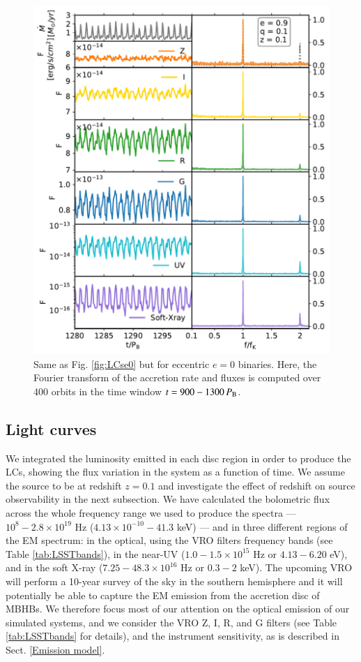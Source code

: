\documentclass{aa}
\begin{document}
\begin{figure}
    \includegraphics[width=\columnwidth]{Figures/e09q01_hr01_md001_3aOpticAll_Flux_bands_9000_0.1_new.pdf}
    \caption{\label{fig:LCse09} 
    Same as Fig. \ref{fig:LCse0} but for eccentric $e=0$ binaries. Here, the Fourier transform of the accretion rate and fluxes is computed over 400 orbits in the time window $t=900-1300 \,P_{\rm B}$. 
}
\end{figure}


\subsection{Light curves}
\label{LCs}


We integrated the luminosity emitted in each disc region in order to produce the LCs, showing the flux variation in the system as a function of time. We assume the source to be at redshift $z=0.1$ and investigate the effect of redshift on source observability in the next subsection. 
We have calculated the bolometric flux across the whole frequency range we used to produce the spectra — $10^8-2.8 \times 10^{19}$ Hz ($4.13 \times 10^{-10} - 41.3$ keV) — and in three different regions of the EM spectrum: in the optical, using the VRO filters frequency bands (see Table \ref{tab:LSSTbands}), in the near-UV ($1.0-1.5 \times 10^{15}$ Hz or $4.13-6.20$ eV), and in the soft X-ray ($7.25-48.3 \times 10^{16}$ Hz or $0.3-2$ keV).
The upcoming VRO will perform a 10-year survey of the sky in the southern hemisphere and it will potentially be able to capture the EM emission from the accretion disc of MBHBs. 
We therefore focus most of our attention on the optical emission of our simulated systems, and we consider the VRO  Z, I, R, and G filters (see Table \ref{tab:LSSTbands} for details), and the instrument sensitivity, as is described in Sect. \ref{Emission model}.
\end{document}
